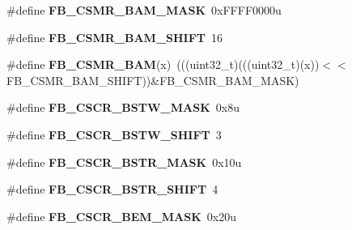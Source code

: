 \begin{DoxyCompactItemize}
\item 
\#define {\bfseries F\+B\+\_\+\+C\+S\+M\+R\+\_\+\+B\+A\+M\+\_\+\+M\+A\+SK}~0x\+F\+F\+F\+F0000u\hypertarget{group__FB__Register__Masks_ga9f7361c70716e7a39579b6418ae2c20c}{}\label{group__FB__Register__Masks_ga9f7361c70716e7a39579b6418ae2c20c}

\item 
\#define {\bfseries F\+B\+\_\+\+C\+S\+M\+R\+\_\+\+B\+A\+M\+\_\+\+S\+H\+I\+FT}~16\hypertarget{group__FB__Register__Masks_ga6a99aa1f2614f6287dfa8a83a2ceead4}{}\label{group__FB__Register__Masks_ga6a99aa1f2614f6287dfa8a83a2ceead4}

\item 
\#define {\bfseries F\+B\+\_\+\+C\+S\+M\+R\+\_\+\+B\+AM}(x)~(((uint32\+\_\+t)(((uint32\+\_\+t)(x))$<$$<$F\+B\+\_\+\+C\+S\+M\+R\+\_\+\+B\+A\+M\+\_\+\+S\+H\+I\+FT))\&F\+B\+\_\+\+C\+S\+M\+R\+\_\+\+B\+A\+M\+\_\+\+M\+A\+SK)\hypertarget{group__FB__Register__Masks_ga2ef6f66f3c2595772b2fc4e841fc834e}{}\label{group__FB__Register__Masks_ga2ef6f66f3c2595772b2fc4e841fc834e}

\item 
\#define {\bfseries F\+B\+\_\+\+C\+S\+C\+R\+\_\+\+B\+S\+T\+W\+\_\+\+M\+A\+SK}~0x8u\hypertarget{group__FB__Register__Masks_gaee04052f66392a6242d45c0598b8606a}{}\label{group__FB__Register__Masks_gaee04052f66392a6242d45c0598b8606a}

\item 
\#define {\bfseries F\+B\+\_\+\+C\+S\+C\+R\+\_\+\+B\+S\+T\+W\+\_\+\+S\+H\+I\+FT}~3\hypertarget{group__FB__Register__Masks_ga34341b855043b3fbffcad2811084fec8}{}\label{group__FB__Register__Masks_ga34341b855043b3fbffcad2811084fec8}

\item 
\#define {\bfseries F\+B\+\_\+\+C\+S\+C\+R\+\_\+\+B\+S\+T\+R\+\_\+\+M\+A\+SK}~0x10u\hypertarget{group__FB__Register__Masks_gac577e626a579979985c559866c940018}{}\label{group__FB__Register__Masks_gac577e626a579979985c559866c940018}

\item 
\#define {\bfseries F\+B\+\_\+\+C\+S\+C\+R\+\_\+\+B\+S\+T\+R\+\_\+\+S\+H\+I\+FT}~4\hypertarget{group__FB__Register__Masks_ga161827d21e9f36d9dc4a42a3fc287dd7}{}\label{group__FB__Register__Masks_ga161827d21e9f36d9dc4a42a3fc287dd7}

\item 
\#define {\bfseries F\+B\+\_\+\+C\+S\+C\+R\+\_\+\+B\+E\+M\+\_\+\+M\+A\+SK}~0x20u\hypertarget{group__FB__Register__Masks_gaef7f70f7c6d39c8e1de2a16ccb4b3ccb}{}\label{group__FB__Register__Masks_gaef7f70f7c6d39c8e1de2a16ccb4b3ccb}


\end{DoxyCompactItemize}
